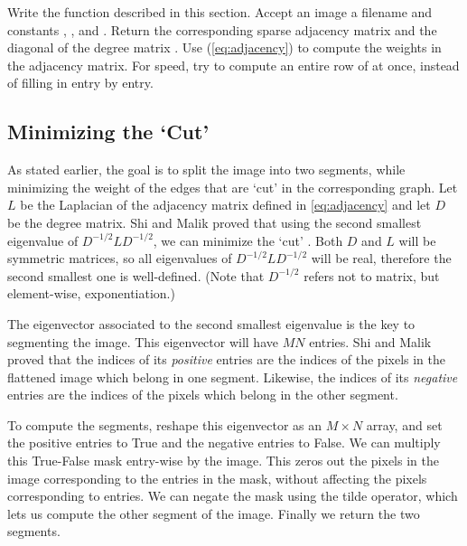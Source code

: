 \begin{problem}
Write the function  described in this section.
Accept an image a filename and constants , , and .
Return the corresponding sparse adjacency matrix  and the diagonal of the degree matrix .
Use (\ref{eq:adjacency}) to compute the weights in the adjacency matrix.
For speed, try to compute an entire row of  at once, instead of filling in  entry by entry.


\label{prob:adjacency_dream}
\end{problem}

\subsection*{Minimizing the `Cut'}
As stated earlier, the goal is to split the image into two segments, while minimizing the weight of the edges that are `cut' in the corresponding graph.
Let $L$ be the Laplacian of the adjacency matrix defined in \ref{eq:adjacency} and let $D$ be the degree matrix.
Shi and Malik proved that using the second smallest eigenvalue of $D^{-1/2}LD^{-1/2}$, we can minimize the `cut' .
Both $D$ and $L$ will be symmetric matrices, so all eigenvalues of $D^{-1/2}LD^{-1/2}$ will be real, therefore the second smallest one is well-defined.
(Note that $D^{-1/2}$ refers not to matrix, but element-wise, exponentiation.)

The eigenvector associated to the second smallest eigenvalue is the key to segmenting the image. 
This eigenvector will have $MN$ entries.
Shi and Malik proved that the indices of its \emph{positive} entries are the indices of the pixels in the flattened image which belong in one segment.
Likewise, the indices of its \emph{negative} entries are the indices of the pixels which belong in the other segment.

To compute the segments, reshape this eigenvector as an $M \times N$ array, and set the positive entries to True and the negative entries to False.
We can multiply this True-False mask entry-wise by the image. 
This zeros out the pixels in the image corresponding to the  entries in the mask, without affecting the pixels corresponding to  entries. 
We can negate the mask using the tilde operator, which lets us compute the other segment of the image. 
Finally we return the two segments.

